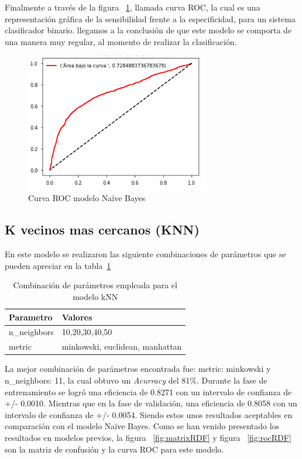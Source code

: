 \documentclass[conference]{IEEEtran}
\begin{document}
Finalmente a través de la figura ~\ref{fig:rocGNB}, llamada curva ROC, la cual es una representación gráfica de la sensibilidad frente a la especificidad, para un sistema clasificador binario. llegamos a la conclusión de que este modelo se comporta de una manera muy regular, al momento de realizar la clasificación.
\begin{center}
    \begin{figure}[H]
        \hfill
     \centerline{\includegraphics[width=8cm]{ROCGNB.png}}
    \caption{Curva ROC modelo Naïve Bayes }
    \label{fig:rocGNB}
    \end{figure}  
\end{center}
\subsection{K vecinos mas cercanos (KNN)}
En este modelo se realizaron las siguiente combinaciones de parámetros que se pueden apreciar en la tabla~\ref{tab:parametrosKNN}
\newline
\begin{table}[H]
\centering
\begin{tabular}{|l|l|}
\hline
Parametro    & Valores              \\ \hline
n\_neighbors & 10,20,30,40,50       \\ \hline
metric    & minkowski, euclidean, manhattan    \\ \hline
\end{tabular}
\caption{Combinación de parámetros empleada para el modelo kNN}
\label{tab:parametrosKNN}
\end{table}
La mejor combinación de parámetros encontrada fue: metric: minkowski y n\_neighbors: 11, la cual obtuvo un \textit{Acurracy} del 81\%.
Durante la fase de entrenamiento se logró una eficiencia de 0.8271 con un intervalo de confianza de +/- 0.0010. Mientras que en la fase de validación, una eficiencia de 0.8058 con un intervalo de confianza de +/- 0.0054. Siendo estos unos resultados aceptables en comparación con el modelo Naïve Bayes.
Como se han venido presentado los resultados en modelos previos, la figura ~\ref{fig:matrixRDF}  y figura ~\ref{fig:rocRDF} son la matriz de confusión y la curva ROC para este modelo.
\end{document}
